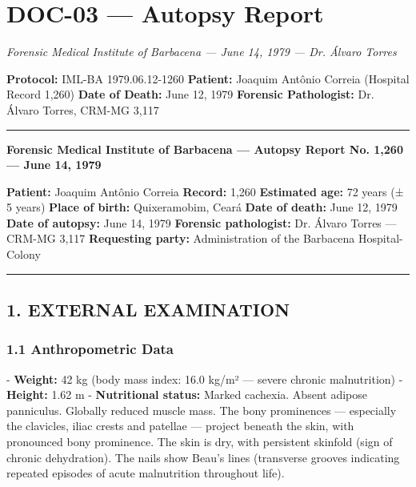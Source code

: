 \section*{\textbf{DOC-03} --- Autopsy Report}

\noindent \textit{Forensic Medical Institute of Barbacena --- June 14, 1979 --- Dr. Álvaro Torres}

\noindent \textbf{Protocol:} IML-BA 1979.06.12-1260
\textbf{Patient:} Joaquim Antônio Correia (Hospital Record 1,260)
\textbf{Date of Death:} June 12, 1979
\textbf{Forensic Pathologist:} Dr. Álvaro Torres, CRM-MG 3,117

\vspace{0.5em}\noindent\rule{\textwidth}{0.5pt}\vspace{0.5em}

\noindent \textbf{Forensic Medical Institute of Barbacena --- Autopsy Report No. 1,260 --- June 14, 1979}

\noindent \textbf{Patient:} Joaquim Antônio Correia
\textbf{Record:} 1,260
\textbf{Estimated age:} 72 years (± 5 years)
\textbf{Place of birth:} Quixeramobim, Ceará
\textbf{Date of death:} June 12, 1979
\textbf{Date of autopsy:} June 14, 1979
\textbf{Forensic pathologist:} Dr. Álvaro Torres --- CRM-MG 3,117
\textbf{Requesting party:} Administration of the Barbacena Hospital-Colony

\vspace{0.5em}\noindent\rule{\textwidth}{0.5pt}\vspace{0.5em}

\subsection*{1. EXTERNAL EXAMINATION}

\subsubsection*{1.1 Anthropometric Data}

\noindent - \textbf{Weight:} 42 kg (body mass index: 16.0 kg/m² --- severe chronic malnutrition)
- \textbf{Height:} 1.62 m
- \textbf{Nutritional status:} Marked cachexia. Absent adipose panniculus. Globally reduced muscle mass. The bony prominences --- especially the clavicles, iliac crests and patellae --- project beneath the skin, with pronounced bony prominence. The skin is dry, with persistent skinfold (sign of chronic dehydration). The nails show Beau's lines (transverse grooves indicating repeated episodes of acute malnutrition throughout life).

